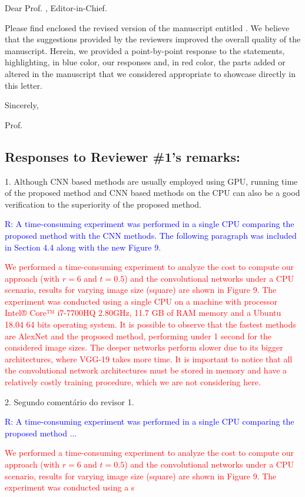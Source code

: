\documentclass[11pt,a4paper]{article}
\begin{document}
Dear Prof. \nomeEditor, Editor-in-Chief.

Please find enclosed the revised version of the manuscript entitled \textbf{\nomeArtigo}. We believe that the suggestions provided by the reviewers improved the overall quality of the manuscript. Herein, we provided a point-by-point response to the statements, highlighting, in blue color, our responses and, in red color, the parts added or altered in the manuscript that we considered appropriate to showcase directly in this letter.

Sincerely,

Prof. \nomeAutor

\subsection*{Responses to Reviewer \#1's remarks:}

1. Although CNN based methods are usually employed using GPU, running time of the proposed method and CNN based methods on the CPU can also be a good verification to the superiority of the proposed method.

\textcolor{blue}{R: A time-consuming experiment was performed in a single CPU comparing the proposed method with the CNN methods. The following paragraph was included in Section 4.4 along with the new Figure 9.}

\textcolor{red}{We performed a time-consuming experiment to analyze the cost to compute our approach (with $r=6$ and $t=0.5$) and the convolutional networks under a CPU scenario, results for varying image size (square) are shown in Figure 9. The experiment was conducted using a single CPU on a machine with processor Intel® Core™ i7-7700HQ 2.80GHz, 11.7 GB of RAM memory and a Ubuntu 18.04 64 bits operating system. It is possible to observe that the fastest methods are AlexNet and the proposed method, performing under 1 second for the considered image sizes. The deeper networks perform slower due to its bigger architectures, where VGG-19 takes more time. It is important to notice that all the convolutional network architectures must be stored in memory and have a relatively costly training procedure, which we are not considering here.}

2. Segundo comentário do revisor 1.

\textcolor{blue}{R: A time-consuming experiment was performed in a single CPU comparing the proposed method ...}

\textcolor{red}{We performed a time-consuming experiment to analyze the cost to compute our approach (with $r=6$ and $t=0.5$) and the convolutional networks under a CPU scenario, results for varying image size (square) are shown in Figure 9. The experiment was conducted using a s}
\end{document}
